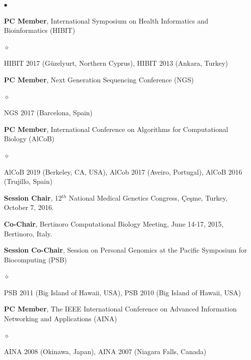 \documentclass[margin,line]{res}
\newenvironment{list2}{
  \begin{list}{$\bullet$}{%
      \setlength{\itemsep}{0.1cm}
      \setlength{\parsep}{0in} \setlength{\parskip}{0in}
      \setlength{\topsep}{0in} \setlength{\partopsep}{0in} 
      \setlength{\leftmargin}{0.2in}}}{\end{list}}
\newenvironment{list3}{
  \begin{list}{$\diamond$}{%
      \setlength{\itemsep}{0in}
      \setlength{\parsep}{0.1cm} \setlength{\parskip}{0.1cm}
      \setlength{\topsep}{0.1cm} \setlength{\partopsep}{0.1cm} 
      \setlength{\leftmargin}{0.2in}}}{\end{list}}
\begin{document}
\begin{resume}
\begin{list2}
\item
  \textbf{PC Member},  International Symposium on Health Informatics and Bioinformatics
  (HIBIT)
  \begin{list3}
  \item HIBIT 2017 (Güzelyurt, Northern Cyprus), HIBIT 2013 (Ankara, Turkey)
  \end{list3}

\item
  \textbf{PC Member},  Next Generation Sequencing Conference (NGS)
  \begin{list3}
  \item NGS 2017 (Barcelona, Spain)
  \end{list3}


\item
  \textbf{PC Member}, International Conference on Algorithms for Computational Biology (AlCoB)
  \begin{list3}
   \item AlCoB 2019 (Berkeley, CA, USA), AlCob 2017 (Aveiro, Portugal), AlCoB 2016 (Trujillo, Spain)
  \end{list3}
  
\item
  \textbf{Session Chair}, 12$^{th}$ National Medical Genetics Congress, Çeşme, Turkey, October 7, 2016.

\item
  \textbf{Co-Chair}, Bertinoro Computational Biology Meeting, June 14-17, 2015, Bertinoro, Italy.

\item 
  \textbf{Session Co-Chair}, Session on Personal Genomics at the Pacific Symposium for Biocomputing (PSB)
    \begin{list3}
    \item PSB 2011 (Big Island of Hawaii, USA), PSB 2010 (Big Island of Hawaii, USA)
    \end{list3}


\item
  \textbf{PC Member}, The IEEE International Conference on
  Advanced Information Networking and Applications (AINA)
  \begin{list3}
  \item AINA 2008 (Okinawa, Japan), AINA 2007 (Niagara Falls, Canada)
  \end{list3}

\end{list2}


\vspace{-0.4cm}

\end{resume}
\end{document}
